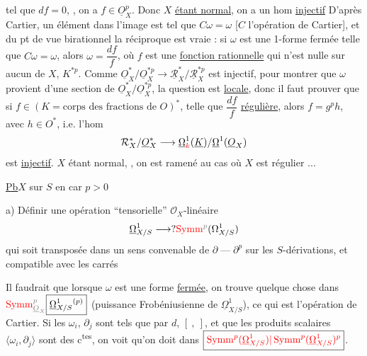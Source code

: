 tel que $df=0$, , on a
$f\in\underline O_X^p$.
Donc $X$ \uline{étant normal}, on a un hom \uline{injectif}
D'après Cartier, un élément dans l'image est tel que
$C\omega=\omega$ [$C$ l'opération de Cartier], et du pt de
vue birationnel la réciproque est vraie : si $\omega$ est une
1-forme fermée telle que $C\omega=\omega$, alors $\omega=\dfrac{df}{f}$,
où $f$ est une \uline{fonction rationnelle} qui n'est nulle
sur aucun  de $X$,
 $K^{*p}$.
Comme $\underline O_X^*/\underline O_X^{*p}\longrightarrow
\underline{\mathcal R}_X^*/\underline{\mathcal R}_X^{*p}$ est injectif,
pour montrer que $\omega$ provient d'une section de
$\underline O_X^*/\underline O_X^{*p}$, la question est \uline{locale},
donc il faut prouver que si $f\in(K=\text{corps des fractions de }O)^*$,
telle que $\dfrac{df}{f}$ \uline{régulière}, alors $f=g^p h$, avec $h\in O^*$,
i.e.  l'hom
\[
\mathcal R_X^*/\underline O_X^*\longrightarrow
\underline\Omega^1_{{\color{red}k}}(\underline K)/\underline\Omega^1(\underline O_X)
\]
est \uline{injectif}. $X$ étant normal, ,
on est ramené au cas où $X$ est  régulier ...

\uline{Pb}\qquad $X$ sur $S$ en car $p>0$

a) Définir une opération ``tensorielle''
$\mathcal O_X$-linéaire
\[
\underline\Omega^1_{X/S}\longrightarrow
?\deleted{\unsure{\operatorname{Symm}}^p}(\Omega^1_{X/S})
\]
qui soit transposée dans un sens convenable
de \deleted{$\unsure{\partial}$} $\partial\mathbin{\text{---}}\partial^p$
sur les $S$-dérivations, et compatible avec les carrés

Il faudrait que lorsque $\omega$ est une forme \uline{fermée},
on trouve quelque chose dans
$\deleted{\unsure{\operatorname{Symm}}^p_{\underline O_X}}\boxed{\underline\Omega^1_{X/S}{}^{(p)}}$
(puissance Frobéniusienne de $\underline\Omega^1_{X/S}$),
ce qui est l'opération de Cartier.
Si les $\omega_i$, $\partial_j$ sont tels que
 par $d$, $[\ ,\ ]$, et que
les produits scalaires $\langle\omega_i,\partial_j\rangle$ sont des c\textsuperscript{tes},
on voit qu'on doit  dans
$\boxed{{\color{red}\operatorname{Symm}^p(\underline\Omega^1_{X/S})|\operatorname{Symm}^p(\underline\Omega^1_{X/S})^p}}$.

